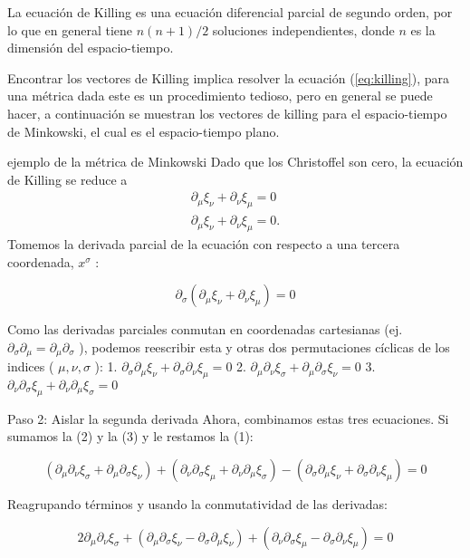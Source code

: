 \begin{note}
    La ecuación de Killing es una ecuación diferencial parcial de segundo orden, por lo que en general tiene $n(n+1)/2$ soluciones independientes, donde $n$ es la dimensión del espacio-tiempo.
\end{note}
Encontrar los vectores de Killing implica resolver la ecuación (\ref{eq:killing}), para una métrica dada este es un procedimiento tedioso, pero en general se puede hacer, a continuación se muestran los vectores de killing para el espacio-tiempo de Minkowski, el cual es el espacio-tiempo plano.

ejemplo de la métrica de Minkowski
Dado que los Christoffel son cero, la ecuación de Killing se reduce a
\begin{equation}
    \begin{aligned}
        \partial_\mu \xi_\nu + \partial_\nu \xi_\mu =0\\
        \partial_\mu \xi_\nu + \partial_\nu \xi_\mu =0.
    \end{aligned}
\end{equation}
Tomemos la derivada parcial de la ecuación con respecto a una tercera coordenada, $x^\sigma$ :

$$
\partial_\sigma\left(\partial_\mu \xi_\nu+\partial_\nu \xi_\mu\right)=0
$$

Como las derivadas parciales conmutan en coordenadas cartesianas (ej. $\partial_\sigma \partial_\mu=\partial_\mu \partial_\sigma$ ), podemos reescribir esta y otras dos permutaciones cíclicas de los indices ( $\mu, \nu, \sigma$ ):
1. $\partial_\sigma \partial_\mu \xi_\nu+\partial_\sigma \partial_\nu \xi_\mu=0$
2. $\partial_\mu \partial_\nu \xi_\sigma+\partial_\mu \partial_\sigma \xi_\nu=0$
3. $\partial_\nu \partial_\sigma \xi_\mu+\partial_\nu \partial_\mu \xi_\sigma=0$

Paso 2: Aislar la segunda derivada
Ahora, combinamos estas tres ecuaciones. Si sumamos la (2) y la (3) y le restamos la (1):

$$
\left(\partial_\mu \partial_\nu \xi_\sigma+\partial_\mu \partial_\sigma \xi_\nu\right)+\left(\partial_\nu \partial_\sigma \xi_\mu+\partial_\nu \partial_\mu \xi_\sigma\right)-\left(\partial_\sigma \partial_\mu \xi_\nu+\partial_\sigma \partial_\nu \xi_\mu\right)=0
$$

Reagrupando términos y usando la conmutatividad de las derivadas:

$$
2 \partial_\mu \partial_\nu \xi_\sigma+\left(\partial_\mu \partial_\sigma \xi_\nu-\partial_\sigma \partial_\mu \xi_\nu\right)+\left(\partial_\nu \partial_\sigma \xi_\mu-\partial_\sigma \partial_\nu \xi_\mu\right)=0
$$


